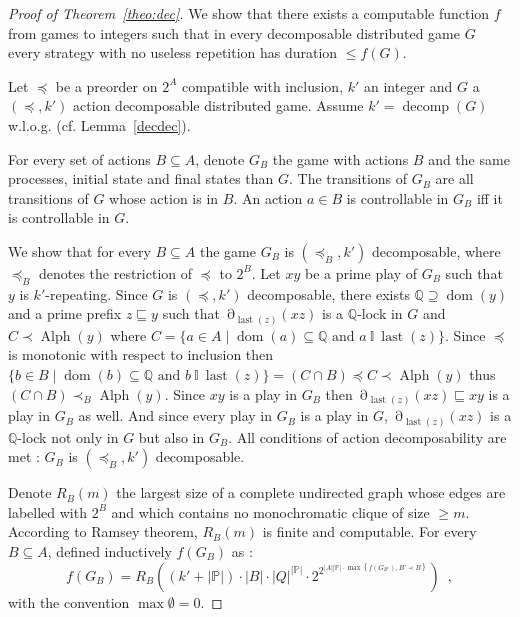 \documentclass[a4paper,UKenglish]{lipics-v2016}
\newcommand{\PP}{\mathbb{P}}
\newcommand{\QQ}{\mathbb{Q}}
\newcommand{\ind}{~\mathbb{I}~}
\newcommand{\pref}{\sqsubseteq}
\DeclareMathOperator{\dom}{dom}
\DeclareMathOperator{\view}{\partial}
\DeclareMathOperator{\last}{last}
\DeclareMathOperator{\alphabet}{Alph}
\DeclareMathOperator{\decomp}{decomp}
\begin{document}
\begin{proof}[Proof of Theorem~\ref{theo:dec}]
\newcommand{\CC}{\mathcal{C}}

We show that there exists a computable function $f$
from games to integers
such that in every decomposable distributed game $G$
every strategy with no useless repetition
has duration $\leq f(G)$.

Let $\preceq$ be a preorder on $2^A$ compatible with inclusion,
$k'$ an integer and 
$G$ a $(\preceq,k')$ action decomposable distributed game.
Assume $k'=\decomp(G)$ w.l.o.g. (cf. Lemma~\ref{decdec}).

For every set of actions $B\subseteq A$,
denote $G_B$ the game with  actions $B$
and the same processes, initial state and final states than $G$.
The transitions of $G_B$ are all transitions of $G$ whose
 action is in $B$. An action $a \in B$ is controllable in $G_B$ iff it is controllable in $G$.


We show that for every $B\subseteq A$ the game $G_B$ is $(\preceq_B,k')$ decomposable,
where $\preceq_B$ denotes the restriction of $\preceq$ to $2^B$. Let $xy$ be a prime play of $G_B$ 
such that $y$ is $k'$-repeating.
Since  $G$ is $(\preceq,k')$ decomposable, there exists
$\QQ\supseteq \dom(y)$ and a prime prefix $z \pref y$
such that $\view_{\last(z)}(xz)$ is a  $\QQ$-lock in $G$
and $C\prec \alphabet(y)$
where
$
C=  \{ a \in A \mid \dom(a) \subseteq \QQ \text{ and $a \ind \last(z)$} \} $.
Since $\preceq$ is monotonic with respect to inclusion
 then $\{ b \in B \mid \dom(b) \subseteq \QQ \text{ and $b\ind \last(z)$} \}
 =
 (C \cap B) \preceq C \prec \alphabet(y)$
 thus
 $(C \cap B) \prec_B  \alphabet(y)$.
 Since $xy$ is a play in $G_B$ then $\view_{\last(z)}(xz)\pref xy$ is a play in $G_B$ as well.
 And since every play in $G_B$ is a play in $G$, $\view_{\last(z)}(xz)$ is a  $\QQ$-lock not only in $G$ but also in $G_B$.
All conditions of action decomposability are met :
  $G_B$ is $(\preceq_B,k')$ decomposable.


\medskip

Denote $R_B(m)$  the largest size of a complete undirected graph whose edges are labelled with $2^B$ 
and which contains no monochromatic clique of size $\geq m$.
According to Ramsey theorem,
$R_B(m)$ is finite and computable. 
For every $B\subseteq A$,
defined inductively $f(G_B)$ as
:
\[
f(G_B)=
R_{B}\left((k'+|\PP|)\cdot 
|B|\cdot |Q|^{|\PP|} 
\cdot 
2^{ 2^{|A||\PP|\cdot \max\left\{ f\left(G_{B'}\right),{B' \prec B}\right\} }}
\right)
\enspace,
\]
with the convention $\max \emptyset = 0$.


\end{proof}
\end{document}
